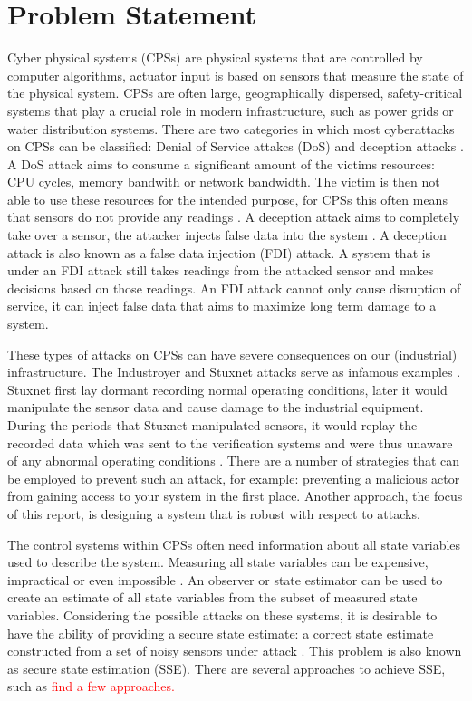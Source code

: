 \section{Problem Statement}
Cyber physical systems (CPSs) are physical systems that are controlled by computer algorithms, actuator input is based on sensors that measure the state of the physical system. CPSs are often large, geographically dispersed, safety-critical systems that play a crucial role in modern infrastructure, such as power grids or water distribution systems. There are two categories in which most cyberattacks on CPSs can be classified: Denial of Service attakcs (DoS) and deception attacks \cite{Ding2021SecureSurvey}. A DoS attack aims to consume a significant amount of the victims resources: CPU cycles, memory bandwith or network bandwidth. The victim is then not able to use these resources for the intended purpose, for CPSs this often means that sensors do not provide any readings \cite{Yu2014AnAttacks}. A deception attack aims to completely take over a sensor, the attacker injects false data into the system \cite{Serpanos2022FalseSystems}. A deception attack is also known as a false data injection (FDI) attack. A system that is under an FDI attack still takes readings from the attacked sensor and makes decisions based on those readings. An FDI attack cannot only cause disruption of service, it can inject false data that aims to maximize long term damage to a system. 

These types of attacks on CPSs can have severe consequences on our (industrial) infrastructure. The Industroyer and Stuxnet attacks serve as infamous examples \cite{Kushner2013TheStuxnet}\cite{Lameiras2022Industroyer:Grid}. Stuxnet first lay dormant recording normal operating conditions, later it would manipulate the sensor data and cause damage to the industrial equipment. During the periods that Stuxnet manipulated sensors, it would replay the recorded data which was sent to the verification systems and were thus unaware of any abnormal operating conditions \cite{Fidler2011Was_Stuxnet_an_Act_of_War_Decoding_a_Cyberattack}. There are a number of strategies that can be employed to prevent such an attack, for example: preventing a malicious actor from gaining access to your system in the first place. Another approach, the focus of this report, is designing a system that is robust with respect to attacks. 

The control systems within CPSs often need information about all state variables used to describe the system. Measuring all state variables can be expensive, impractical or even impossible \cite{yappa}. An observer or state estimator can be used to create an estimate of all state variables from the subset of measured state variables. Considering the possible attacks on these systems, it is desirable to have the ability of providing a secure state estimate: a correct state estimate constructed from a set of noisy sensors under attack \cite{Shoukry2017SecureApproach}. This problem is also known as secure state estimation (SSE). There are several approaches to achieve SSE, such as \textcolor{red}{find a few approaches.}

